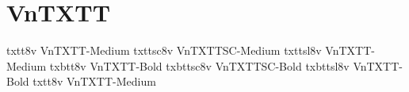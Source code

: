 \documentclass[sample]{vnsample}
\begin{document}
\section{VnTXTT}
 {txtt8v}        {VnTXTT-Medium}
 {txttsc8v}        {VnTXTTSC-Medium}
 {txttsl8v}        {VnTXTT-Medium}
 {txbtt8v}        {VnTXTT-Bold}
 {txbttsc8v}        {VnTXTTSC-Bold}
 {txbttsl8v}        {VnTXTT-Bold}
 {txtt8v}        {VnTXTT-Medium}
\end{document}
